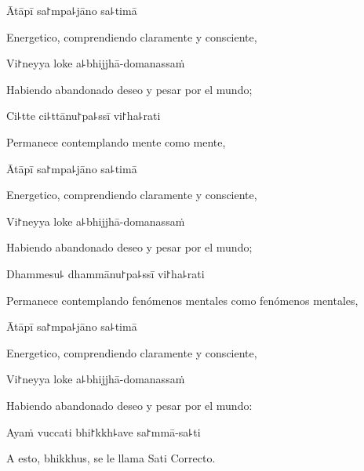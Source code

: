 \ifaivedition
\clearpage
\fi

Ātāpī sa꜓mpa꜕jāno sa꜕timā

\begin{english}
	Energetico, comprendiendo claramente y consciente,
\end{english}

Vi꜓neyya loke a꜕bhijjhā-domanassaṁ

\begin{english}
	Habiendo abandonado deseo y pesar por el mundo;
\end{english}

Ci꜕tte ci꜕ttānu꜓pa꜕ssī vi꜓ha꜕rati

\begin{english}
	Permanece contemplando mente como mente,
\end{english}

Ātāpī sa꜓mpa꜕jāno sa꜕timā

\begin{english}
	Energetico, comprendiendo claramente y consciente,
\end{english}

Vi꜓neyya loke a꜕bhijjhā-domanassaṁ

\begin{english}
	Habiendo abandonado deseo y pesar por el mundo;
\end{english}

Dhammesu꜕ dhammānu꜓pa꜕ssī vi꜓ha꜕rati

\begin{english}
	Permanece contemplando fenómenos mentales como fenómenos mentales,
\end{english}

Ātāpī sa꜓mpa꜕jāno sa꜕timā

\begin{english}
	Energetico, comprendiendo claramente y consciente,
\end{english}

Vi꜓neyya loke a꜕bhijjhā-domanassaṁ

\begin{english}
	Habiendo abandonado deseo y pesar por el mundo:
\end{english}

Ayaṁ vuccati bhi꜓kkh꜕ave sa꜓mmā-sa꜕ti

\begin{english}
	A esto, bhikkhus, se le  llama Sati Correcto.
\end{english}

\ifaivedition
\clearpage
\fi

